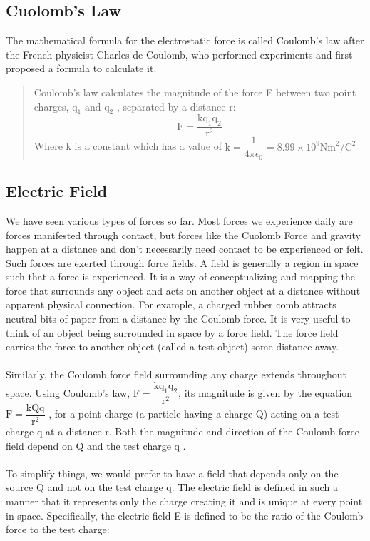 \documentclass[9pt]{article}
\begin{document}
	\subsection*{Cuolomb's Law}
	The mathematical formula for the electrostatic force is called Coulomb’s law after the French physicist Charles de Coulomb, who performed experiments and first proposed a formula to calculate it.
	\begin{quotation}
		Coulomb’s law calculates the magnitude of the force  F  between two point charges,  $\text{q}_1\text{  and  q}_2$ , separated by a distance r:
		$$\text{F}=\dfrac{\text{kq}_1\text{q}_2}{\text{r}^2}$$
		Where k is a constant which has a value of $\text{k}=\dfrac{1}{4\pi\epsilon_0}=8.99\times10^{9}\text{Nm}^2/\text{C}^2$
	\end{quotation}
	\subsection*{Electric Field}
	We have seen various types of forces so far. Most forces we experience daily are forces manifested through contact, but forces like the Cuolomb Force and gravity happen at a distance and don't necessarily need contact to be experienced or felt. Such forces are exerted through force fields. A field is generally a region in space such that a force is experienced. It is a way of conceptualizing and mapping the force that surrounds any object and acts on another object at a distance without apparent physical connection. For example, a charged rubber comb attracts neutral bits of paper from a distance by the Coulomb force. It is very useful to think of an object being surrounded in space by a force field. The force field carries the force to another object (called a test object) some distance away.  \\ \\
	Similarly, the Coulomb force field surrounding any charge extends throughout space. Using Coulomb’s law,  $\text{F}=\dfrac{\text{kq}_1\text{q}_2}{\text{r}^2}$, its magnitude is given by the equation  $\text{F}=\dfrac{\text{kQq}}{\text{r}^2}$ , for a point charge (a particle having a charge Q) acting on a test charge  q at a distance r. Both the magnitude and direction of the Coulomb force field depend on  Q  and the test charge  q . \\ \\
	To simplify things, we would prefer to have a field that depends only on the source Q and not on the test charge q. The electric field is defined in such a manner that it represents only the charge creating it and is unique at every point in space. Specifically, the electric field E is defined to be the ratio of the Coulomb force to the test charge:
\end{document}
